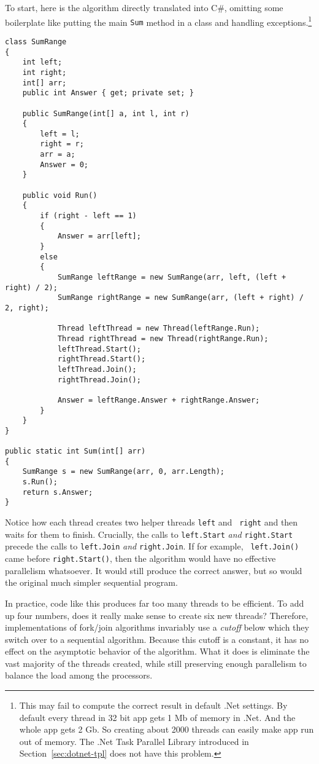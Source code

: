 \documentclass[10pt]{article}
\begin{document}
To start, here is the algorithm directly translated into C\#,
omitting some boilerplate like putting the main {\tt Sum} method in a
class and handling exceptions.\footnote{This may fail to compute the 
 correct result in default .Net settings. By default every thread in 32 
 bit app gets 1 Mb of memory in .Net. And the whole app gets 2 Gb. So 
 creating about 2000 threads can easily make app run out of memory. 
 The .Net Task Parallel Library introduced in Section~\ref{sec:dotnet-tpl} 
 does not have this problem.}
\begin{verbatim}
class SumRange
{
    int left;
    int right;
    int[] arr;
    public int Answer { get; private set; }

    public SumRange(int[] a, int l, int r)
    {
        left = l;
        right = r;
        arr = a;
        Answer = 0;
    }

    public void Run()
    {
        if (right - left == 1)
        {
            Answer = arr[left];
        }
        else
        {
            SumRange leftRange = new SumRange(arr, left, (left + right) / 2);
            SumRange rightRange = new SumRange(arr, (left + right) / 2, right);

            Thread leftThread = new Thread(leftRange.Run);
            Thread rightThread = new Thread(rightRange.Run);
            leftThread.Start();
            rightThread.Start();
            leftThread.Join();
            rightThread.Join();

            Answer = leftRange.Answer + rightRange.Answer;
        }
    }
}

public static int Sum(int[] arr)
{
    SumRange s = new SumRange(arr, 0, arr.Length);
    s.Run();
    return s.Answer;
}
\end{verbatim}
Notice how each thread creates two helper threads {\tt left} and {\tt
  right} and then waits for them to finish.  Crucially, the calls to
  {\tt left.Start} \emph{and} {\tt right.Start} precede the calls to
{\tt left.Join} \emph{and} {\tt right.Join}.  If for example, {\tt
  left.Join()} came before {\tt right.Start()}, then the algorithm
  would have no effective parallelism whatsoever.  It would still
  produce the correct answer, but so would the original much simpler
  sequential program.
  
  In practice, code like this produces far too many threads to be
  efficient.  To add up four numbers, does it really make sense to
  create six new threads?  Therefore, implementations of fork/join
  algorithms invariably use a \emph{cutoff} below which they switch
  over to a sequential algorithm.  Because this cutoff is a constant,
  it has no effect on the asymptotic behavior of the algorithm.  What
  it does is eliminate the vast majority of the threads created, while
  still preserving enough parallelism to balance the load among the
  processors.
\end{document}
